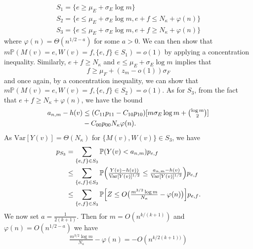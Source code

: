 \documentclass[10pt,journal,compsoc]{IEEEtran}
\theoremstyle{definition}
\begin{document}
\begin{IEEEproof}
\begin{IEEEproof}[Eq.~\eqref{eq:30}]
\begin{gather}
  \label{eq:32}
    S_1 = \{  e \geq
        \mu_E + \sigma_E \log{m}\} \\
    S_2 = \{  e \leq
        \mu_E + \sigma_E \log{m},e + f \leq
        N_\kappa + \varphi(n)\} \\
    S_3 = \{ e \leq \mu_E + \sigma_E \log{m}, e + f \geq
        N_\kappa + \varphi(n)\}
\end{gather}
where $\varphi(n) = \Theta(n^{1/2 - a})$ for some $a > 0$. We can then
show that $m\mathbb{P}(M(v) = e,
W(v) =f, \{e,f\} \in S_1) = o(1)$ by applying a concentration
inequality. Similarly, $e + f \geq N_{\kappa}$ and $e \leq \mu_{E}
+ \sigma_{E} \log{m}$ implies that
\begin{equation}
  \label{eq:33}
  f \geq \mu_{F} + (z_{m} - o(1)) \sigma_F 
\end{equation}
and once again, by a concentration inequality, we can show that $m
\mathbb{P}(M(v) = e, W(v) = f, \{e,f\} \in S_2) = o(1)$. As for
$S_3$, from the fact that $e + f \geq N_{\kappa} + \varphi(n)$, we have the bound
  \begin{equation}
    \begin{split}
    a_{n,m} - h(v) &\leq (C_{11} p_{11} - C_{10} p_{10})[m \sigma_E
    \log{m} + \tbinom{\log{m}}{2}] \\ &- C_{00}p_{00} N_\kappa
    \varphi(n).
    \end{split}
  \end{equation}
  As $\mathrm{Var}[Y(v)] = \Theta(N_\kappa)$ for $\{M(v), W(v)\} \in
  S_3$, we have
  \begin{equation}
    \label{eq:39}
    \begin{split}
      p_{S_3} &= \sum_{\{e,f\} \in S_3} \mathbb{P}( Y(v) < a_{n,m}) p_{e,f} 
      \\ &\leq \sum_{\{e,f\} \in S_3} \mathbb{P}\Bigl(\tfrac{Y(v) - h(v))}{\mathrm{Var}[Y(v)]^{1/2}} \leq \tfrac{a_{n,m} -
      h(v)}{\mathrm{Var}[Y(v)]^{1/2}}\Bigr)p_{e,f} \\
    &\leq \sum_{\{e,f\} \in S_3} \mathbb{P}\Bigl[Z \leq
    O\bigl(\tfrac{m^{3/2} \log m}{N_{\kappa}} - \varphi(n)\bigr)\Bigr]
    p_{e,f}.
    \end{split}
  \end{equation}
  We now set $a = \tfrac{1}{2(k+1)}$. Then for $m =
  O(n^{k/(k+1)})$ and $\varphi(n) = O(n^{1/2 - a})$ we have
  \begin{equation}
    \label{eq:41}
    \tfrac{m^{3/2} \log m}{N_\kappa} - \varphi(n) =
    -O(n^{k/2(k+1))})
  \end{equation}

\end{IEEEproof}
\end{IEEEproof}
\end{document}

